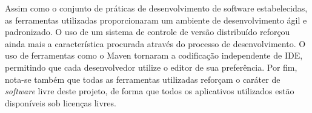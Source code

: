 Assim como o conjunto de práticas de desenvolvimento de software estabelecidas, as ferramentas utilizadas proporcionaram um ambiente de desenvolvimento ágil e padronizado.
O uso de um sistema de controle de versão distribuído reforçou ainda mais a característica procurada através do processo de desenvolvimento.
O uso de ferramentas como o Maven tornaram a codificação independente de IDE, permitindo que cada desenvolvedor utilize o editor de sua preferência.
Por fim, nota-se também que todas as ferramentas utilizadas reforçam o caráter de \emph{software} livre deste projeto, de forma que todos os aplicativos utilizados estão disponíveis sob licenças livres. 
